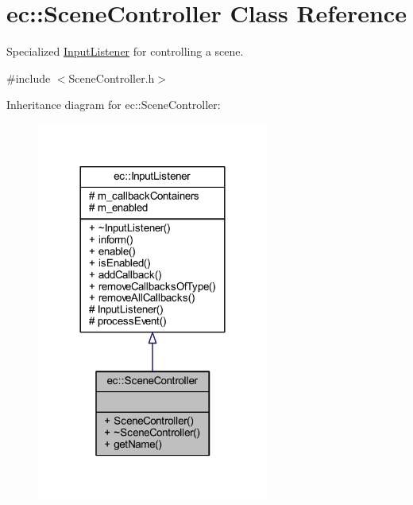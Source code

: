 \hypertarget{classec_1_1_scene_controller}{}\section{ec\+:\+:Scene\+Controller Class Reference}
\label{classec_1_1_scene_controller}


Specialized \mbox{\hyperlink{classec_1_1_input_listener}{Input\+Listener}} for controlling a scene.  




{\ttfamily \#include $<$Scene\+Controller.\+h$>$}



Inheritance diagram for ec\+:\+:Scene\+Controller\+:\nopagebreak
\begin{figure}[H]
\begin{center}
\leavevmode
\includegraphics[width=216pt]{classec_1_1_scene_controller__inherit__graph}
\end{center}
\end{figure}


